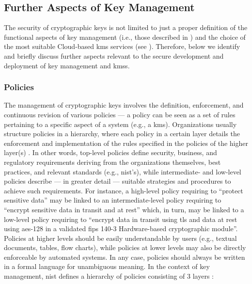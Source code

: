\subsection{Further Aspects of Key Management}\label{sec:further:key_management}

The security of cryptographic keys is not limited to just a proper definition of the functional aspects of key management (i.e., those described in ) and the choice of the most suitable Cloud-based \gls{kms} services (see ). Therefore, below we identify and briefly discuss further aspects relevant to the secure development and deployment of key management and \glspl{kms}.



\subsubsection{Policies}\label{sec:further:key_management:policies}

The management of cryptographic keys involves the definition, enforcement, and continuous revision of various policies --- a policy can be seen as a set of rules pertaining to a specific aspect of a system (e.g., a \gls{kms}). Organizations usually structure policies in a hierarchy, where each policy in a certain layer details the enforcement and implementation of the rules specified in the policies of the higher layer(s) \cite{barker_framework_2013}. In other words, top-level policies define security, business, and regulatory requirements deriving from the organizations themselves, best practices, and relevant standards (e.g., \gls{nist}'s), while intermediate- and low-level policies describe --- in greater detail --- suitable strategies and procedures to achieve such requirements. For instance, a high-level policy requiring to ``protect sensitive data'' may be linked to an intermediate-level policy requiring to ``encrypt sensitive data in transit and at rest'' which, in turn, may be linked to a low-level policy requiring to ``encrypt data in transit using \gls{tls} and data at rest using \gls{aes}-128 in a validated \gls{fips} 140-3 Hardware-based cryptographic module''. Policies at higher levels should be easily understandable by users (e.g., textual documents, tables, flow charts), while policies at lower levels may also be directly enforceable by automated systems. In any case, policies should always be written in a formal language for unambiguous meaning. In the context of key management, \gls{nist} defines a hierarchy of policies consisting of 3 layers \cite{barker_framework_2013}:

